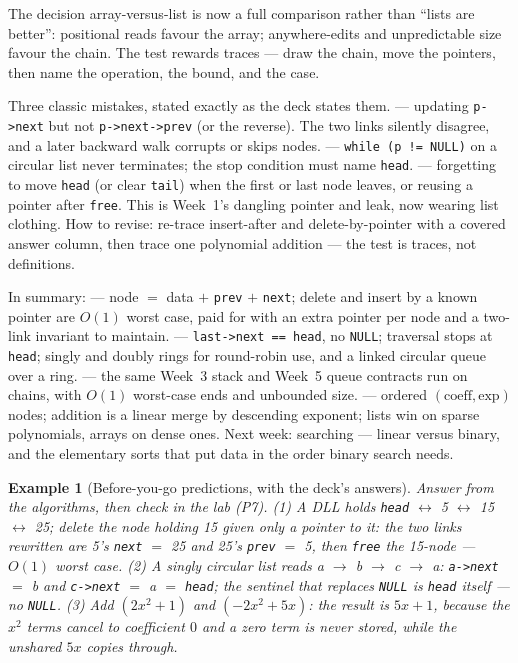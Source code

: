 \documentclass[11pt]{article}
\newtheorem{example}{Example}[section]
\begin{document}
The decision array-versus-list is now a full comparison rather than ``lists are better'': positional reads favour the array; anywhere-edits and unpredictable size favour the chain. The test rewards traces --- draw the chain, move the pointers, then name the operation, the bound, and the case.

Three classic mistakes, stated exactly as the deck states them.  --- updating \texttt{p->next} but not \texttt{p->next->prev} (or the reverse). The two links silently disagree, and a later backward walk corrupts or skips nodes.  --- \texttt{while (p != NULL)} on a circular list never terminates; the stop condition must name \texttt{head}.  --- forgetting to move \texttt{head} (or clear \texttt{tail}) when the first or last node leaves, or reusing a pointer after \texttt{free}. This is Week~1's dangling pointer and leak, now wearing list clothing. How to revise: re-trace insert-after and delete-by-pointer with a covered answer column, then trace one polynomial addition --- the test is traces, not definitions.

In summary:  --- node $=$ data $+$ \texttt{prev} $+$ \texttt{next}; delete and insert by a known pointer are $O(1)$ worst case, paid for with an extra pointer per node and a two-link invariant to maintain.  --- \texttt{last->next == head}, no \texttt{NULL}; traversal stops at \texttt{head}; singly and doubly rings for round-robin use, and a linked circular queue over a ring.  --- the same Week~3 stack and Week~5 queue contracts run on chains, with $O(1)$ worst-case ends and unbounded size.  --- ordered $(\text{coeff}, \text{exp})$ nodes; addition is a linear merge by descending exponent; lists win on sparse polynomials, arrays on dense ones. Next week: searching --- linear versus binary, and the elementary sorts that put data in the order binary search needs.

\begin{example}[Before-you-go predictions, with the deck's answers]
Answer from the algorithms, then check in the lab (P7). (1) A DLL holds \texttt{head} $\leftrightarrow$ 5 $\leftrightarrow$ 15 $\leftrightarrow$ 25; delete the node holding 15 given only a pointer to it: the two links rewritten are 5's \texttt{next} $=$ 25 and 25's \texttt{prev} $=$ 5, then \texttt{free} the 15-node --- $O(1)$ worst case. (2) A singly circular list reads a $\to$ b $\to$ c $\to$ a: \texttt{a->next} $=$ b and \texttt{c->next} $=$ a $=$ \texttt{head}; the sentinel that replaces \texttt{NULL} is \texttt{head} itself --- no \texttt{NULL}. (3) Add $(2x^{2} + 1)$ and $(-2x^{2} + 5x)$: the result is $5x + 1$, because the $x^{2}$ terms cancel to coefficient $0$ and a zero term is never stored, while the unshared $5x$ copies through.
\end{example}
\end{document}
